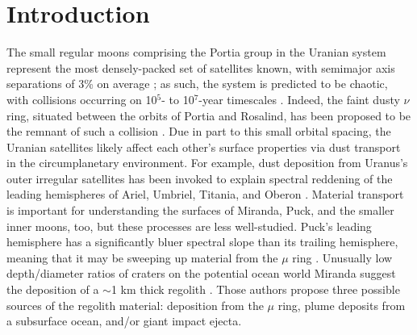 \documentclass[preprint]{aastex631}
\begin{document}
\section{Introduction}
\label{s:intro}

The small regular moons comprising the Portia group in the Uranian system represent the most densely-packed set of satellites known, with semimajor axis separations of 3\% on average \citep{showalter20}; as such, the system is predicted to be chaotic, with collisions occurring on 10$^5$- to 10$^7$-year timescales \citep{duncan97, french12}. Indeed, the faint dusty $\nu$ ring, situated between the orbits of Portia and Rosalind, has been proposed to be the remnant of such a collision \citep{showalter20}. Due in part to this small orbital spacing, the Uranian satellites likely affect each other's surface properties via dust transport in the circumplanetary environment. For example, dust deposition from Uranus's outer irregular satellites has been invoked to explain spectral reddening of the leading hemispheres of Ariel, Umbriel, Titania, and Oberon \citep{cartwright18}. Material transport is important for understanding the surfaces of Miranda, Puck, and the smaller inner moons, too, but these processes are less well-studied. 
Puck's leading hemisphere has a significantly bluer spectral slope than its trailing hemisphere, meaning that it may be sweeping up material from the $\mu$ ring \citep{french17}. %
Unusually low depth/diameter ratios of craters on the potential ocean world Miranda suggest the deposition of a $\sim$1 km thick regolith \citep{cartwright21, beddingfield22}. Those authors propose three possible sources of the regolith material: deposition from the $\mu$ ring, plume deposits from a subsurface ocean, and/or giant impact ejecta.
\end{document}
